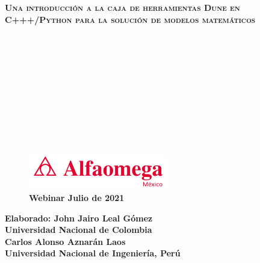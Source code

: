 



{
\begin{frame}

	\color{c++reviewduneblue}
	
		\begin{flushleft}\bfseries\scshape\huge
		Una introducción a la caja de herramientas Dune en
		C+++/Python para la solución de modelos matemáticos
		\end{flushleft}
	
	\

	\

	\

	\

	\

	\

	\begin{minipage}{0.47\textwidth}
		\begin{figure}[ht!]
		\centering
		\includegraphics[height=1.5cm]{alfaomega}
		\caption*{\large\bfseries\textcolor{c++reviewduneblue}{Webinar Julio de 2021}}
		\end{figure}
	\end{minipage}
	\begin{minipage}{0.5\textwidth}
		\begin{flushright}\large\bfseries
				Elaborado: John Jairo Leal Gómez\\
				Universidad Nacional de Colombia\\
				Carlos Alonso Aznarán Laos\\
				Universidad Nacional de Ingeniería, Perú
			\end{flushright}
	\end{minipage}

\end{frame}
}

